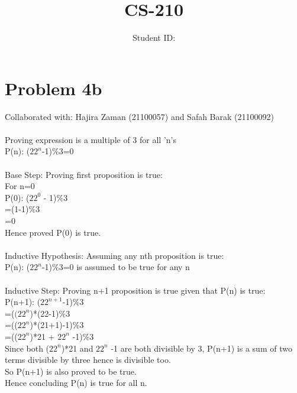 \documentclass{article}
\title{CS-210 \hwNo}
\author{\myname \qquad Student ID: \myid}
\begin{document}
\maketitle

\section{Problem 4b}
Collaborated with: Hajira Zaman (21100057) and Safah Barak (21100092)\\\\
Proving expression is a multiple of 3 for all 'n's\\
P(n): ($22^{n}$-1)$\%$3=0\\\\
Base Step: Proving first proposition is true:\\
For n=0\\
P(0):  ($22^{0}$ - 1)$\%$3\\
=(1-1)$\%$3\\
=0\\
Hence proved P(0) is true.\\\\
Inductive Hypothesis: Assuming any nth proposition is true:\\
P(n): ($22^{n}$-1)$\%$3=0 is assumed to be true for any n\\\\
Inductive Step: Proving  n+1 proposition is true given that P(n) is true:\\
P(n+1): ($22^{n+1}$-1)$\%$3\\
=($(22^{n}$)*(22-1)$\%$3\\
=(($22^{n}$)*(21+1)-1)$\%$3\\
=(($22^{n}$)*21 + $22^{n}$ -1)$\%$3\\ 
Since both ($22^{n}$)*21 and $22^{n}$ -1 are both divisible by 3, P(n+1) is a sum of two terms divisible by three hence is divisible too.\\
So P(n+1) is also proved to be true.\\
Hence concluding P(n) is true for all n.\\
\end{document}
